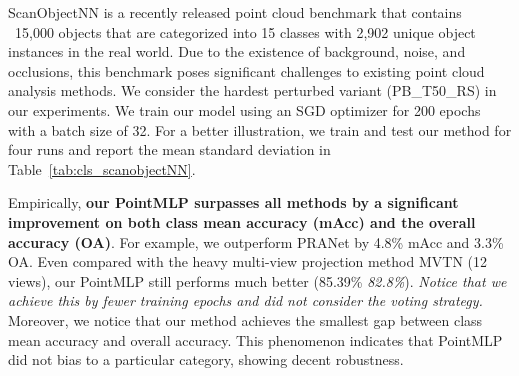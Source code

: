 \documentclass{article} \usepackage{iclr2022_conference,times}
\begin{document}
ScanObjectNN is a recently released point cloud benchmark that contains ~15,000 objects that are categorized into 15 classes with 2,902 unique object instances in the real world. Due to the existence of background, noise, and occlusions, this benchmark poses significant challenges to existing point cloud analysis methods. We consider the hardest perturbed variant (PB\_T50\_RS) in our experiments. We train our model using an SGD optimizer for 200 epochs with a batch size of 32. For a better illustration, we train and test our method for four runs and report the mean  standard deviation in Table~\ref{tab:cls_scanobjectNN}.

Empirically, \textbf{our PointMLP surpasses all methods by a significant improvement on both class mean accuracy (mAcc) and the overall accuracy (OA)}. For example, we outperform PRANet by 4.8\% mAcc and 3.3\% OA. Even compared with the heavy multi-view projection method MVTN (12 views), our PointMLP still performs much better (85.39\% \textit{82.8\%}). \textit{Notice that we achieve this by fewer training epochs and did not consider the voting strategy.}
Moreover, we notice that our method achieves the smallest gap between class mean accuracy and overall accuracy. This phenomenon indicates that PointMLP did not bias to a particular category, showing decent robustness.
\end{document}
